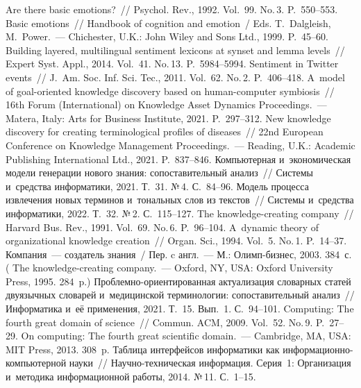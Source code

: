 \begin{multicols}{2}
{\small\frenchspacing
 {%
 \begin{thebibliography}{99}
 Are there basic emotions?~// Psychol. Rev., 1992. Vol.~99. No.\,3.  
P.~550--553.
 Basic emotions~// Handbook of cognition and emotion~/ Eds. T.~Dalgleish, 
M.~Power.~--- Chichester, U.K.: John Wiley and Sons Ltd., 1999. P.~45--60. 
 Building layered, multilingual sentiment 
lexicons at synset and lemma levels~// Expert Syst. Appl., 2014. Vol.~41. No.\,13. 
P.~5984--5994.
 Sentiment in Twitter events~// J.~Am. Soc.  
Inf. Sci. Tec., 2011. Vol.~62. No.\,2. P.~406--418.
 A~model of goal-oriented knowledge discovery based on human-computer 
symbiosis~// 16th Forum (International) on Knowledge Asset Dynamics Proceedings.~--- Matera, Italy: 
Arts for Business Institute, 2021. P.~297--312.
 New knowledge discovery for creating terminological profiles of 
diseases~// 22nd European Conference on Knowledge Management Proceedings.~--- Reading, U.K.: 
Academic Publishing International Ltd., 2021. P.~837--846.
 Компьютерная и~экономическая модели генерации нового знания: 
сопоставительный анализ~// Системы и~средства информатики, 2021. Т.~31. №\,4. С.~84--96.
 Модель процесса извлечения новых терминов и~тональных слов из 
текстов~// Системы и~средства информатики, 2022. Т.~32. №\,2. С.~115--127.
 The knowledge-creating company~// Harvard Bus. Rev., 1991. Vol.~69. No.\,6.  
P.~96--104.
 A~dynamic theory of organizational knowledge creation~// Organ. Sci., 1994. Vol.~5. 
No.\,1. P.~14--37.
 Компания~--- создатель знания~/ Пер. c англ.~--- М.: Олимп-бизнес, 
2003. 384~с. ( The knowledge-creating company.~--- Oxford, NY, 
USA: Oxford University Press, 1995. 284~p.)
 Проб\-лем\-но-ори\-ен\-ти\-ро\-ван\-ная актуализация словарных статей 
двуязычных словарей и~медицинской терминологии: сопоставительный анализ~// Информатика 
и~её применения, 2021. Т.~15. Вып.~1. С.~94--101.
 Computing: The fourth great domain of science~// Commun. 
ACM, 2009. Vol.~52. No.\,9. P.~27--29.
 On computing: The fourth great scientific domain.~--- Cambridge, MA, USA: 
MIT Press, 2013. 308~p.
 Таблица интерфейсов информатики как ин\-фор\-ма\-ци\-он\-но-компью\-тер\-ной науки~//
  Научно-тех\-ни\-че\-ская информация. Серия~1: Организация и~методика информационной работы, 2014.
№\,11. С.~1--15.
  


\end{thebibliography}}}
\end{multicols}
